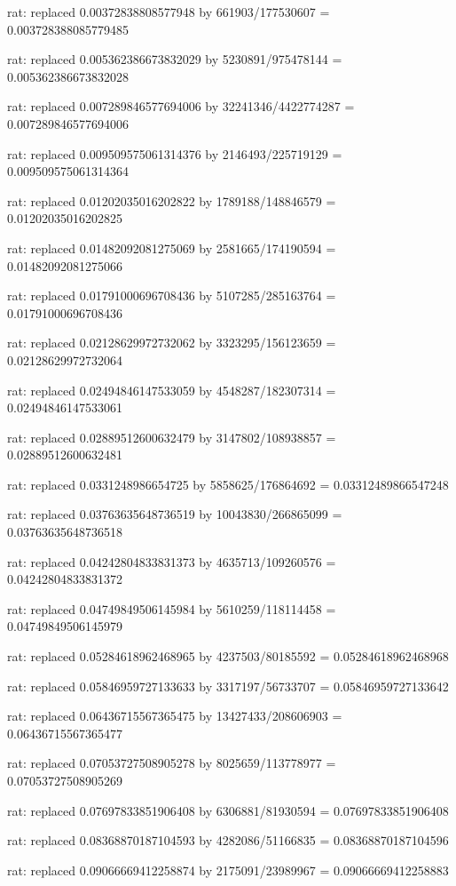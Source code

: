 \documentclass[a4paper,10pt]{article}
\begin{document}
\begin{eulernotebook}
\begin{eulercomment}
\begin{eulercomment}
\begin{eulercomment}
\begin{eulercomment}
\begin{eulercomment}
\begin{eulercomment}
\begin{eulercomment}
\begin{eulercomment}
\begin{eulercomment}
\begin{eulercomment}
\begin{eulercomment}
\begin{eulercomment}
\begin{eulercomment}
\begin{eulercomment}
\begin{eulercomment}
\begin{eulercomment}
\begin{euleroutput}
  rat: replaced 0.00372838808577948 by 661903/177530607 = 0.003728388085779485
  
  rat: replaced 0.005362386673832029 by 5230891/975478144 = 0.005362386673832028
  
  rat: replaced 0.007289846577694006 by 32241346/4422774287 = 0.007289846577694006
  
  rat: replaced 0.009509575061314376 by 2146493/225719129 = 0.009509575061314364
  
  rat: replaced 0.01202035016202822 by 1789188/148846579 = 0.01202035016202825
  
  rat: replaced 0.01482092081275069 by 2581665/174190594 = 0.01482092081275066
  
  rat: replaced 0.01791000696708436 by 5107285/285163764 = 0.01791000696708436
  
  rat: replaced 0.02128629972732062 by 3323295/156123659 = 0.02128629972732064
  
  rat: replaced 0.02494846147533059 by 4548287/182307314 = 0.02494846147533061
  
  rat: replaced 0.02889512600632479 by 3147802/108938857 = 0.02889512600632481
  
  rat: replaced 0.0331248986654725 by 5858625/176864692 = 0.03312489866547248
  
  rat: replaced 0.03763635648736519 by 10043830/266865099 = 0.03763635648736518
  
  rat: replaced 0.04242804833831373 by 4635713/109260576 = 0.04242804833831372
  
  rat: replaced 0.04749849506145984 by 5610259/118114458 = 0.04749849506145979
  
  rat: replaced 0.05284618962468965 by 4237503/80185592 = 0.05284618962468968
  
  rat: replaced 0.05846959727133633 by 3317197/56733707 = 0.05846959727133642
  
  rat: replaced 0.06436715567365475 by 13427433/208606903 = 0.06436715567365477
  
  rat: replaced 0.07053727508905278 by 8025659/113778977 = 0.07053727508905269
  
  rat: replaced 0.07697833851906408 by 6306881/81930594 = 0.07697833851906408
  
  rat: replaced 0.08368870187104593 by 4282086/51166835 = 0.08368870187104596
  
  rat: replaced 0.09066669412258874 by 2175091/23989967 = 0.09066669412258883
  

\end{euleroutput}
\end{eulercomment}
\end{eulercomment}
\end{eulercomment}
\end{eulercomment}
\end{eulercomment}
\end{eulercomment}
\end{eulercomment}
\end{eulercomment}
\end{eulercomment}
\end{eulercomment}
\end{eulercomment}
\end{eulercomment}
\end{eulercomment}
\end{eulercomment}
\end{eulercomment}
\end{eulercomment}
\end{eulernotebook}
\end{document}
